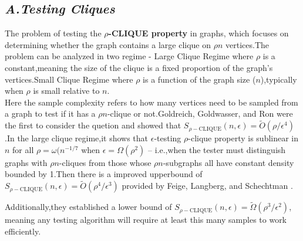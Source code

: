 \documentclass[preprint,11pt]{elsarticle}
\theoremstyle{definition}
\begin{document}
\begin{multicols}{2}
\subsection*{\textit{\textbf{A.Testing Cliques}}}
    The problem of testing the \textbf{$\rho$-CLIQUE property} in graphs, which focuses on determining whether the graph contains a large clique on $\rho n$ vertices.The problem can be analyzed in two regime - Large Clique Regime where $\rho$ is a constant,meaning the size of the clique is a fixed proportion of the graph's vertices.Small Clique Regime where $\rho$ is a function of the graph size ($n$),typically when $\rho$ is small relative to $n$.
    \\Here the sample complexity refers to how many vertices need to be sampled from a graph to test if it has a $\rho n$-clique or not.Goldreich, Goldwasser, and Ron \cite{GGR98} were the first to consider the quetion and showed that $S_{\rho-{\text{CLIQUE}}}(n,\epsilon) = \tilde{O}(\rho/\epsilon^4)$.In the large clique regime,it shows that $\epsilon$-testing $\rho$-clique property is sublinear in $n$ for all $\rho=\omega(n^{-1/7}$ when $\epsilon=\Omega(\rho^2)$ -- i.e.,when the tester must distinguish graphs with $\rho n$-cliques from those whose $\rho n$-subgraphs all have constant density bounded by 1.Then there is a improved upperbound of $S_{\rho-\text{CLIQUE}}(n,\epsilon)=\tilde{O}(\rho^4/\epsilon^3)$ provided by Feige, Langberg, and Schechtman \cite{FLS04}.
    
    Additionally,they established a lower bound of $S_{\rho-\text{CLIQUE}}(n,\epsilon)=\tilde{\Omega}(\rho^3/\epsilon^2)$, meaning any testing algorithm will require at least this many samples to work efficiently.
    

\end{multicols}
\end{document}

